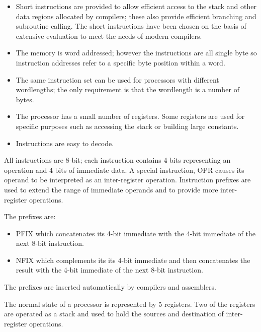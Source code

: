 \documentclass[a4paper, 12pt]{article}
\begin{document}
\begin{itemize}

\item Short instructions are provided to allow efficient
access to the stack and other data regions allocated
by compilers; these also provide efficient branching and 
subroutine calling. The short instructions have been chosen on 
the basis of extensive evaluation to meet the needs of 
modern compilers. 

\item The memory is word addressed; however the 
instructions are all single byte so instruction 
addresses refer to a specific byte position within a 
word. 

\item The same instruction set can be used for processors 
with different wordlengths; the only requirement is that 
the wordlength is a number of bytes. 

\item The processor has a small number of registers. 
Some registers are used for specific purposes such as 
accessing the stack or building large constants. 

\item Instructions are easy to decode. 

\end{itemize}

All instructions are 8-bit; each instruction contains 4 bits representing
an operation and 4 bits of immediate data. A special instruction, OPR
causes its operand to be interpreted as an inter-register operation. 
Instruction prefixes are used to extend the range of immediate operands 
and to provide more inter-register operations. 

The prefixes are:

\begin{itemize}
\item PFIX which concatenates its 4-bit immediate with the 4-bit immediate
of the next 8-bit instruction.
\item NFIX which complements its its 4-bit immediate and then concatenates 
the result with the 4-bit immediate of the next 8-bit instruction. 
\end{itemize}

The prefixes are inserted automatically by compilers
and assemblers. 

The normal state of a processor is represented by 5 registers.
Two of the registers are operated as a stack and used to hold the
sources and destination of inter-register operations. 
\end{document}
